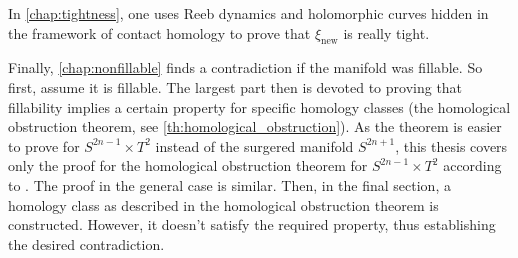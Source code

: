 In \cref{chap:tightness}, one uses Reeb dynamics and holomorphic curves hidden in the framework of contact homology to prove that $\xi_\text{new}$
is really tight.

Finally, \cref{chap:nonfillable} finds a contradiction if the manifold was fillable. So first, assume it is fillable.
The largest part then is devoted to proving that fillability implies a certain property for specific homology classes
(the homological obstruction theorem, see \cref{th:homological_obstruction}).
As the theorem is easier to prove for $S^{2n-1} \times T^2$ instead of the surgered manifold $S^{2n+1}$,
this thesis covers only the proof for the homological obstruction theorem for $S^{2n-1} \times T^2$ according to \cite{BGM22}. 
The proof in the general case is similar.
Then, in the final section, a homology class as described in the homological obstruction theorem is constructed.
However, it doesn't satisfy the required property, thus establishing the desired contradiction.
